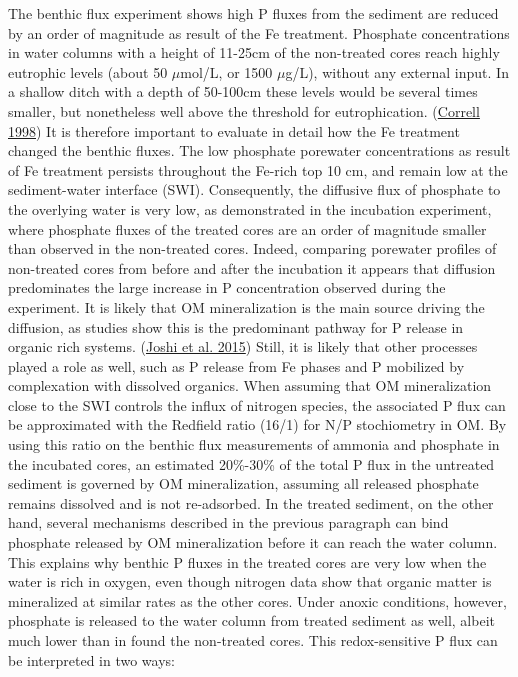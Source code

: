 \documentclass[a4paper,11pt]{article}
\begin{document}
The benthic flux experiment shows high P fluxes from the sediment are reduced by an order of magnitude as result of the Fe treatment. Phosphate concentrations in water columns with a height of 11-25cm of the non-treated cores reach highly eutrophic levels (about 50 \(\mu\)mol/L, or 1500 \(\mu\)g/L), without any external input. In a shallow ditch with a depth of 50-100cm these levels would be several times smaller, but nonetheless well above the threshold for eutrophication. (\protect\hyperlink{ref-correllRolePhosphorusEutrophication1998}{Correll 1998}) It is therefore important to evaluate in detail how the Fe treatment changed the benthic fluxes. The low phosphate porewater concentrations as result of Fe treatment persists throughout the Fe-rich top 10 cm, and remain low at the sediment-water interface (SWI). Consequently, the diffusive flux of phosphate to the overlying water is very low, as demonstrated in the incubation experiment, where phosphate fluxes of the treated cores are an order of magnitude smaller than observed in the non-treated cores. Indeed, comparing porewater profiles of non-treated cores from before and after the incubation it appears that diffusion predominates the large increase in P concentration observed during the experiment. It is likely that OM mineralization is the main source driving the diffusion, as studies show this is the predominant pathway for P release in organic rich systems. (\protect\hyperlink{ref-joshiOrganicMatterRemineralization2015}{Joshi et al. 2015}) Still, it is likely that other processes played a role as well, such as P release from Fe phases and P mobilized by complexation with dissolved organics. When assuming that OM mineralization close to the SWI controls the influx of nitrogen species, the associated P flux can be approximated with the Redfield ratio (16/1) for N/P stochiometry in OM. By using this ratio on the benthic flux measurements of ammonia and phosphate in the incubated cores, an estimated 20\%-30\% of the total P flux in the untreated sediment is governed by OM mineralization, assuming all released phosphate remains dissolved and is not re-adsorbed. In the treated sediment, on the other hand, several mechanisms described in the previous paragraph can bind phosphate released by OM mineralization before it can reach the water column. This explains why benthic P fluxes in the treated cores are very low when the water is rich in oxygen, even though nitrogen data show that organic matter is mineralized at similar rates as the other cores. Under anoxic conditions, however, phosphate is released to the water column from treated sediment as well, albeit much lower than in found the non-treated cores. This redox-sensitive P flux can be interpreted in two ways:
\end{document}

